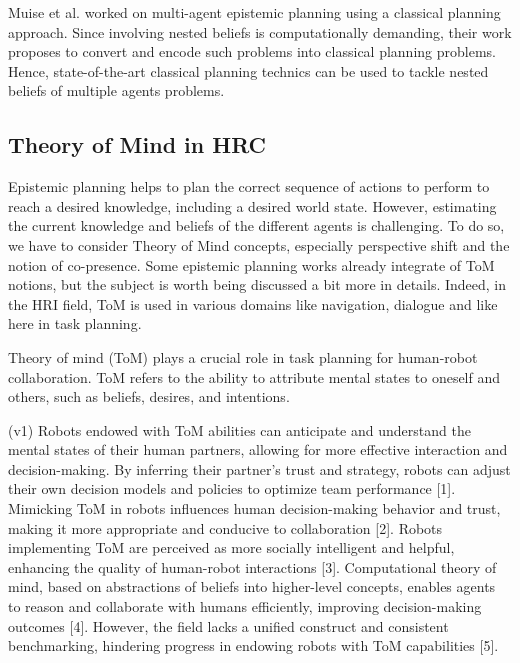     Muise et al. worked on multi-agent epistemic planning using a classical planning approach. Since involving nested beliefs is computationally demanding, their work proposes to convert and encode such problems into classical planning problems. Hence, state-of-the-art classical planning technics can be used to tackle nested beliefs of multiple agents problems. 

    \subsection{Theory of Mind in HRC}
    Epistemic planning helps to plan the correct sequence of actions to perform to reach a desired knowledge, including a desired world state. However, estimating the current knowledge and beliefs of the different agents is challenging. To do so, we have to consider Theory of Mind concepts, especially perspective shift and the notion of co-presence. Some epistemic planning works already integrate of ToM notions, but the subject is worth being discussed a bit more in details. Indeed, in the HRI field, ToM is used in various domains like navigation, dialogue and like here in task planning. 

    Theory of mind (ToM) plays a crucial role in task planning for human-robot collaboration. 
    ToM refers to the ability to attribute mental states to oneself and others, such as beliefs, desires, and intentions. 
    
    (v1) Robots endowed with ToM abilities can anticipate and understand the mental states of their human partners, allowing for more effective interaction and decision-making. By inferring their partner's trust and strategy, robots can adjust their own decision models and policies to optimize team performance [1]. Mimicking ToM in robots influences human decision-making behavior and trust, making it more appropriate and conducive to collaboration [2]. Robots implementing ToM are perceived as more socially intelligent and helpful, enhancing the quality of human-robot interactions [3]. Computational theory of mind, based on abstractions of beliefs into higher-level concepts, enables agents to reason and collaborate with humans efficiently, improving decision-making outcomes [4]. However, the field lacks a unified construct and consistent benchmarking, hindering progress in endowing robots with ToM capabilities [5].

